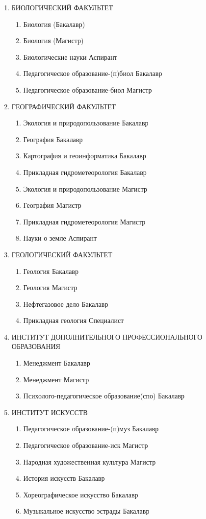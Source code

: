 \begin{enumerate}
\item БИОЛОГИЧЕСКИЙ ФАКУЛЬТЕТ

\begin{enumerate}
\item Биология (Бакалавр)
\item Биология (Магистр)
\item Биологические науки	Аспирант
\item Педагогическое образование-(п)биол	Бакалавр
\item Педагогическое образование-биол	Магистр
\end{enumerate}

\item ГЕОГРАФИЧЕСКИЙ ФАКУЛЬТЕТ

\begin{enumerate}
\item Экология и природопользование	Бакалавр
\item География	Бакалавр
\item Картография и геоинформатика	Бакалавр
\item Прикладная гидрометеорология	Бакалавр
\item Экология и природопользование	Магистр
\item География	Магистр
\item Прикладная гидрометеорология	Магистр
\item Науки о земле	Аспирант
\end{enumerate}

\item ГЕОЛОГИЧЕСКИЙ ФАКУЛЬТЕТ
\begin{enumerate}
\item Геология	Бакалавр
\item Геология	Магистр
\item Нефтегазовое дело	Бакалавр
\item Прикладная геология	Специалист
\end{enumerate}

\item ИНСТИТУТ ДОПОЛНИТЕЛЬНОГО ПРОФЕССИОНАЛЬНОГО ОБРАЗОВАНИЯ
\begin{enumerate}
\item Менеджмент	Бакалавр
\item Менеджмент	Магистр
\item Психолого-педагогическое образование(спо)	Бакалавр
\end{enumerate}

\item ИНСТИТУТ ИСКУССТВ
\begin{enumerate}
\item Педагогическое образование-(п)муз	Бакалавр
\item Педагогическое образование-иск	Магистр
\item Народная художественная культура	Магистр
\item История искусств	Бакалавр
\item Хореографическое искусство	Бакалавр
\item Музыкальное искусство эстрады	Бакалавр
\end{enumerate}


\end{enumerate}
